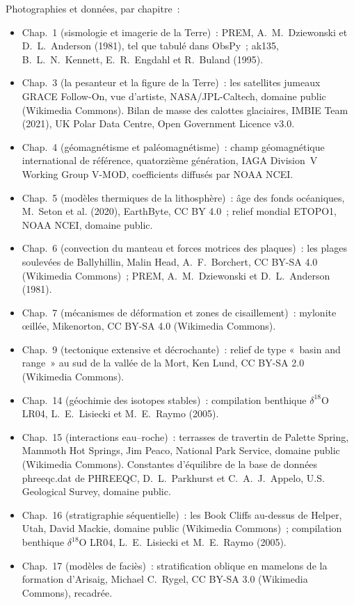 \bigskip
\noindent Photographies et données, par chapitre~:
\begin{itemize}\small
  \item Chap.~1 (sismologie et imagerie de la Terre)~: PREM, A.~M.~Dziewonski et D.~L.~Anderson (1981), tel que tabulé dans ObsPy~; ak135, B.~L.~N.~Kennett, E.~R.~Engdahl et R.~Buland (1995).
  \item Chap.~3 (la pesanteur et la figure de la Terre)~: les satellites jumeaux GRACE Follow-On, vue d'artiste, NASA/JPL-Caltech, domaine public (Wikimedia Commons). Bilan de masse des calottes glaciaires, IMBIE Team (2021), UK Polar Data Centre, Open Government Licence v3.0.
  \item Chap.~4 (géomagnétisme et paléomagnétisme)~: champ géomagnétique international de référence, quatorzième génération, IAGA Division~V Working Group V-MOD, coefficients diffusés par NOAA NCEI.
  \item Chap.~5 (modèles thermiques de la lithosphère)~: âge des fonds océaniques, M.~Seton et al. (2020), EarthByte, CC BY 4.0~; relief mondial ETOPO1, NOAA NCEI, domaine public.
  \item Chap.~6 (convection du manteau et forces motrices des plaques)~: les plages soulevées de Ballyhillin, Malin Head, A.~F.~Borchert, CC BY-SA 4.0 (Wikimedia Commons)~; PREM, A.~M.~Dziewonski et D.~L.~Anderson (1981).
  \item Chap.~7 (mécanismes de déformation et zones de cisaillement)~: mylonite œillée, Mikenorton, CC BY-SA 4.0 (Wikimedia Commons).
  \item Chap.~9 (tectonique extensive et décrochante)~: relief de type «~basin and range~» au sud de la vallée de la Mort, Ken Lund, CC BY-SA 2.0 (Wikimedia Commons).
  \item Chap.~14 (géochimie des isotopes stables)~: compilation benthique $\delta^{18}$O LR04, L.~E.~Lisiecki et M.~E.~Raymo (2005).
  \item Chap.~15 (interactions eau--roche)~: terrasses de travertin de Palette Spring, Mammoth Hot Springs, Jim Peaco, National Park Service, domaine public (Wikimedia Commons). Constantes d'équilibre de la base de données phreeqc.dat de PHREEQC, D.~L.~Parkhurst et C.~A.~J.~Appelo, U.S. Geological Survey, domaine public.
  \item Chap.~16 (stratigraphie séquentielle)~: les Book Cliffs au-dessus de Helper, Utah, David Mackie, domaine public (Wikimedia Commons)~; compilation benthique $\delta^{18}$O LR04, L.~E.~Lisiecki et M.~E.~Raymo (2005).
  \item Chap.~17 (modèles de faciès)~: stratification oblique en mamelons de la formation d'Arisaig, Michael C.~Rygel, CC BY-SA 3.0 (Wikimedia Commons), recadrée.

\end{itemize}
